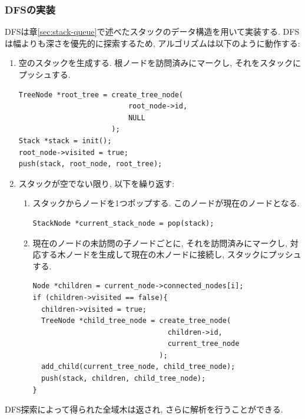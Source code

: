 \documentclass[a4j, 12pt]{jarticle}
\begin{document}
\subsubsection{DFSの実装}
DFSは章\ref{sec:stack-queue}で述べたスタックのデータ構造を用いて実装する. DFSは幅よりも深さを優先的に探索するため, アルゴリズムは以下のように動作する:
\begin{enumerate}
  \item 空のスタックを生成する. 根ノードを訪問済みにマークし, それをスタックにプッシュする.
  \begin{lstlisting}[caption=全域木とスタックの初期化,label=lst:init-queue-tree-2]
TreeNode *root_tree = create_tree_node(
                          root_node->id,
                          NULL
                      );
Stack *stack = init();
root_node->visited = true;
push(stack, root_node, root_tree);
  \end{lstlisting}
  \item スタックが空でない限り, 以下を繰り返す:
  \begin{enumerate}
    \item スタックからノードを1つポップする. このノードが現在のノードとなる.
    \begin{lstlisting}[caption=スタックからノード取り出す,label=lst:pop-stack]
StackNode *current_stack_node = pop(stack);
    \end{lstlisting}
    \item 現在のノードの未訪問の子ノードごとに, それを訪問済みにマークし, 対応する木ノードを生成して現在の木ノードに接続し, スタックにプッシュする.
    \begin{lstlisting}[caption=本ノードの各子ノードをスタックに入れる,label=lst:push-stack-nodes]
Node *children = current_node->connected_nodes[i];
if (children->visited == false){
  children->visited = true;
  TreeNode *child_tree_node = create_tree_node(
                                children->id, 
                                current_tree_node
                              );
  add_child(current_tree_node, child_tree_node);
  push(stack, children, child_tree_node);
}
    \end{lstlisting}
  \end{enumerate}
\end{enumerate}
DFS探索によって得られた全域木は返され, さらに解析を行うことができる.
\end{document}
